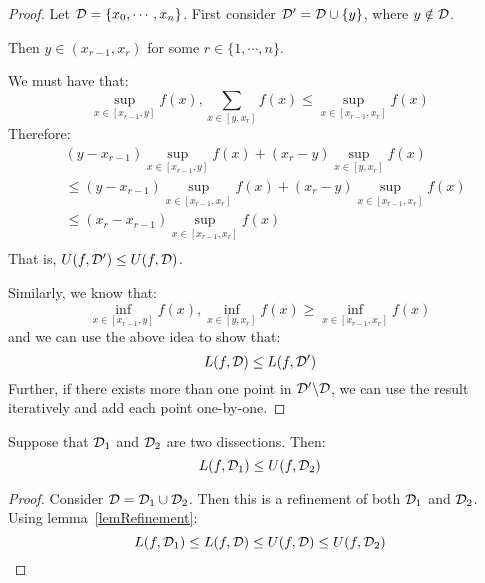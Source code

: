 \documentclass[../Main.tex]{subfiles}
\begin{document}
\begin{proof}
    Let $\mathcal{D} = \{x_0, \cdots, x_n\}$. First consider $\mathcal{D}' = \mathcal{D} \cup \{y\}$, where $y \notin\mathcal{D}$.\par
    Then $y \in (x_{r - 1}, x_r)$ for some $r \in \{1, \cdots, n\}$.\par
    We must have that:
    \begin{equation*}
        \sup_{x \in [x_{r - 1}, y]} f(x), \sum_{x \in [y, x_r]} f(x) \leq \sup_{x \in [x_{r - 1}, x_r]} f(x)
    \end{equation*}
    Therefore:
    \begin{align*}
        &(y - x_{r - 1}) \sup_{x \in [x_{r - 1}, y]}f(x) + (x_r - y) \sup_{x \in [y, x_r]} f(x) \\
        &\leq (y - x_{r - 1}) \sup_{x \in [x_{r - 1}, x_r]}f(x) + (x_r - y) \sup_{x \in [x_{r - 1}, x_r]} f(x) \\
        &\leq (x_r - x_{r - 1}) \sup_{x \in [x_{r - 1}, x_r]}f(x) \\
    \end{align*}
    That is, $U(f, \mathcal{D}') \leq U(f, \mathcal{D})$.\par
    Similarly, we know that:
    \begin{equation*}
        \inf_{x \in [x_{r - 1}, y]} f(x), \inf_{x \in [y, x_r]} f(x) \geq \inf_{x \in [x_{r - 1}, x_r]} f(x)
    \end{equation*}
    and we can use the above idea to show that:
    \begin{equation*}
        L(f, \mathcal{D}) \leq L(f, \mathcal{D}')
    \end{equation*}
    Further, if there exists more than one point in $\mathcal{D}' \backslash \mathcal{D}$, we can use the result iteratively and add each point one-by-one.
\end{proof}
\begin{lemma}
    Suppose that $\mathcal{D}_1$ and $\mathcal{D}_2$ are two dissections. Then:
    \begin{equation*}
        L(f, \mathcal{D}_1) \leq U(f, \mathcal{D}_2)
    \end{equation*}
    \label{lemUpperSumAlwaysGreater}
\end{lemma}
\begin{proof}
    Consider $\mathcal{D} = \mathcal{D}_1 \cup \mathcal{D}_2$. Then this is a refinement of both $\mathcal{D}_1$ and $\mathcal{D}_2$. Using lemma~\ref{lemRefinement}:
    \begin{equation*}
        L(f, \mathcal{D}_1) \leq L(f, \mathcal{D}) \leq U(f, \mathcal{D}) \leq U(f, \mathcal{D}_2)
    \end{equation*}
\end{proof}
\end{document}
